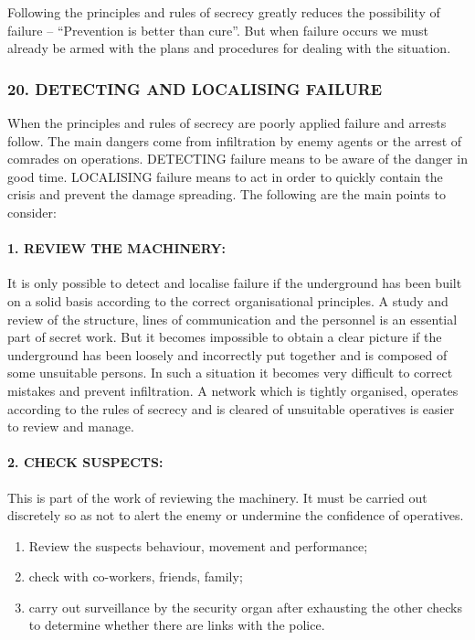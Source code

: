 Following the principles and rules of secrecy greatly reduces the
possibility of failure -- ``Prevention is better than cure''. But when
failure occurs we must already be armed with the plans and procedures
for dealing with the situation.

\subsubsection{20. DETECTING AND LOCALISING FAILURE}

When the principles and rules of secrecy are poorly applied failure and
arrests follow. The main dangers come from infiltration by enemy agents
or the arrest of comrades on operations. DETECTING failure means to be
aware of the danger in good time. LOCALISING failure means to act in
order to quickly contain the crisis and prevent the damage spreading.
The following are the main points to consider:

\paragraph{1. REVIEW THE MACHINERY:}

It is only possible to detect and localise failure if the underground
has been built on a solid basis according to the correct organisational
principles. A study and review of the structure, lines of communication
and the personnel is an essential part of secret work. But it becomes
impossible to obtain a clear picture if the underground has been loosely
and incorrectly put together and is composed of some unsuitable persons.
In such a situation it becomes very difficult to correct mistakes and
prevent infiltration. A network which is tightly organised, operates
according to the rules of secrecy and is cleared of unsuitable
operatives is easier to review and manage.

\paragraph{2. CHECK SUSPECTS:}

This is part of the work of reviewing the machinery. It must be carried
out discretely so as not to alert the enemy or undermine the confidence
of operatives.

\begin{enumerate}
\tightlist
\item
  Review the suspects behaviour, movement and performance;
\item
  check with co-workers, friends, family;
\item
  carry out surveillance by the security organ after exhausting the
  other checks to determine whether there are links with the police.
\end{enumerate}

